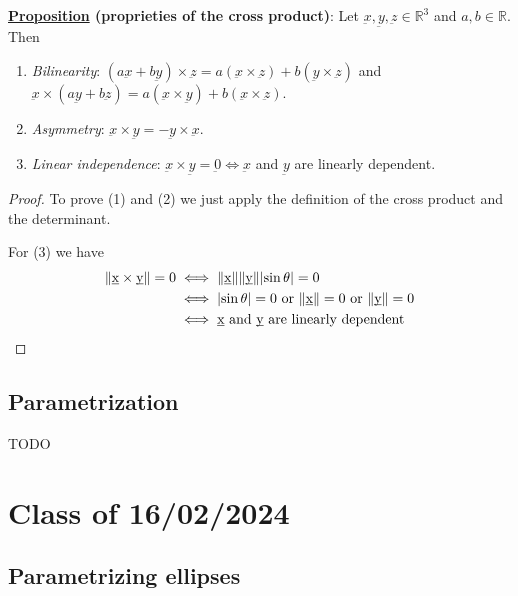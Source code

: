 \documentclass[10pt]{extarticle}
\newcommand{\R}{\mathbb{R}}
\begin{document}
\textbf{\underline{Proposition} (proprieties of the cross product)}:
Let $\underbar{x}, \underbar{y}, \underbar{z} \in \R^3$ and $a, b \in \R$. Then

\begin{enumerate}
    \item \textit{Bilinearity}: $(a \underbar{x} + b \underbar{y}) \times \underbar{z} = a (\underbar{x} \times \underbar{z}) + b (\underbar{y} \times \underbar{z})$ and $\underbar{x} \times (a \underbar{y} + b \underbar{z}) = a (\underbar{x} \times \underbar{y}) + b (\underbar{x} \times \underbar{z})$.
    \item \textit{Asymmetry}: $\underbar{x} \times \underbar{y} = - \underbar{y} \times \underbar{x}$.
    \item \textit{Linear independence}: $\underbar{x} \times \underbar{y} = \underbar{0} \iff \underbar{x}$ and $\underbar{y}$ are linearly dependent.
\end{enumerate}

\begin{proof}
    To prove (1) and (2) we just apply the definition of the cross product and the determinant.

    For (3) we have
    \begin{align*}
        \norm{\underbar{x} \times \underbar{y}} = 0
         & \iff
        \norm {\underbar{x}} \norm{\underbar{y}} \abs{\sin \theta} = 0                                        \\
         & \iff \abs{\sin \theta} = 0 \text{ or } \norm{\underbar{x}} = 0 \text{ or } \norm{\underbar{y}} = 0 \\
         & \iff \underbar{x} \text{ and } \underbar{y} \text{ are linearly dependent}
    \end{align*}

\end{proof}

\subsection{Parametrization}

TODO

\section{Class of 16/02/2024}

\subsection{Parametrizing ellipses}
\end{document}
